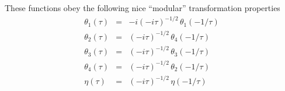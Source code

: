 \documentclass[11pt]{iopart}
\begin{document}
These functions obey the following nice ``modular'' transformation properties
\begin{eqnarray}
 \theta_1(\tau)&=&-i (-i \tau )^{-1/2}\,\theta_1(-1/\tau)\\
 \theta_2(\tau)&=&(-i \tau )^{-1/2}\,\theta_4(-1/\tau)\\\label{eq:modtheta3}
 \theta_3(\tau)&=&(-i \tau )^{-1/2}\,\theta_3(-1/\tau)\\\label{eq:modtheta4}
 \theta_4(\tau)&=&(-i \tau )^{-1/2}\,\theta_2(-1/\tau)\\\label{eq:modeta}
 \eta(\tau)&=&(-i \tau )^{-1/2}\,\eta(-1/\tau)
\end{eqnarray}
\end{document}
